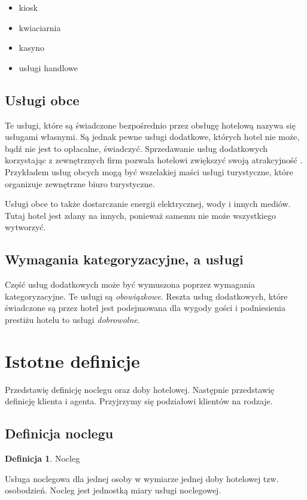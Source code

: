 \documentclass[a4paper,onecolumn,oneside,11pt,wide,floatssmall]{mwrep}
\theoremstyle{definition}
\newtheorem{defn}{Definicja}[section]
\theoremstyle{plain}%
\theoremstyle{remark}
\begin{document}
\begin{itemize}
  \item kiosk
  \item kwiaciarnia
  \item kasyno
  \item usługi handlowe
\end{itemize}

\subsection{Usługi obce}
Te usługi, które są świadczone bezpośrednio przez obsługę hotelową nazywa 
się usługami własnymi. Są jednak pewne usługi dodatkowe, których hotel nie 
może, bądź nie jest to opłacalne, świadczyć. Sprzedawanie usług dodatkowych 
korzystając z zewnętrznych firm pozwala hotelowi zwiększyć swoją atrakcyjność
. Przykładem usług obcych mogą być wszelakiej maści usługi turystyczne, 
które organizuje zewnętrzne biuro turystyczne.

Usługi obce to także dostarczanie energii elektrycznej, wody i innych mediów.
 Tutaj hotel jest zdany na innych, ponieważ samemu nie może wszystkiego 
wytworzyć.

\subsection{Wymagania kategoryzacyjne, a usługi}
Część usług dodatkowych może być wymuszona poprzez wymagania kategoryzacyjne.
 Te usługi są \emph{obowiązkowe}. Reszta usług dodatkowych, które świadczone 
 są przez hotel jest podejmowana dla wygody gości i podniesienia prestiżu 
 hotelu to usługi \emph{dobrowolne}.

\section{Istotne definicje}
Przedstawię definicję noclegu oraz doby hotelowej. Następnie przedstawię 
definicję klienta i agenta. Przyjrzymy się podziałowi klientów na rodzaje.

\subsection{Definicja noclegu}

\begin{defn}{Nocleg}

Usługa noclegowa dla jednej osoby w wymiarze jednej doby hotelowej tzw. 
osobodzień. Nocleg jest jednostką miary usługi noclegowej.

\end{defn} 
\end{document}
